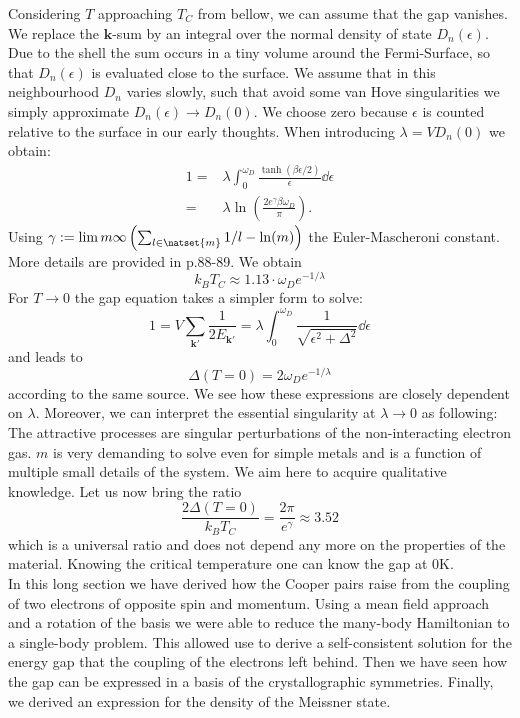 \documentclass[../main.tex]{subfile}
\begin{document}
Considering $T$ approaching $T_C$ from bellow, we can assume that the gap vanishes. We replace the $\bm{k}$-sum by an integral over the normal 
density of state $D_n(\epsilon)$. Due to the shell the sum occurs in a tiny volume around the Fermi-Surface, so that $D_n(\epsilon)$ is 
evaluated close to the surface. We assume that in this neighbourhood $D_n$ varies slowly, such that avoid some van Hove singularities we 
simply approximate $D_n(\epsilon) \rightarrow D_n(0)$. We choose zero because $\epsilon$ is counted relative to the surface in our early thoughts. 
When introducing $\lambda = V D_n(0)$ we obtain:
\begin{equation*}
    \begin{aligned}
        1 =& \lambda \int_0^{\omega_D} \frac{\tanh\left(\beta\epsilon/2\right)}{\epsilon} \dd \epsilon\\
        =& \lambda \ln\left(\frac{2e^{\gamma}\beta \omega_D}{\pi}\right).
    \end{aligned}
\end{equation*}
Using $\gamma := \lim{m}{\infty} \left(\sum_{l\in\natset{m}} 1/l - \ln(m)\right)$ the Euler-Mascheroni constant. More details are provided
in \cite{FossheimSudbo2004} p.88-89. We obtain
\[
    k_B T_C \approx 1.13\cdot  \omega_D e^{-1/\lambda}
\]
For $T\rightarrow 0$ the gap equation takes a simpler form to solve:
\begin{equation*}
        1 = V \sum_{\bm{k}'} \frac{1}{2 E_{\bm{k}'}} = \lambda\int_0^{\omega_D}  \frac{1}{\sqrt{\epsilon^2 + \Delta^2}}\dd \epsilon
\end{equation*}
and leads to 
\[
    \Delta(T=0) = 2 \omega_D e^{-1/\lambda}
\]
according to the same source. We see how these expressions are closely dependent on $\lambda$. Moreover, we can interpret the essential singularity
at $\lambda\rightarrow 0$ as following: The attractive processes are singular perturbations of the non-interacting electron gas.
$m$ is very demanding to solve even for simple metals and is a function of multiple small details of the system. We aim here 
to acquire qualitative knowledge. Let us now bring the ratio
\[
    \frac{2\Delta(T=0)}{k_B T_C} = \frac{2 \pi}{e^{\gamma}} \approx 3.52
\]  
which is a universal ratio and does not depend any more on the properties of the material. Knowing the critical temperature one can know
the gap at $0\si{\kelvin}$.\\

In this long section we have derived how the Cooper pairs raise from the coupling of two electrons of opposite spin and momentum. Using a mean field approach
and a rotation of the basis we were able to reduce the many-body Hamiltonian to a single-body problem. This allowed use to derive a self-consistent solution for 
the energy gap that the coupling of the electrons left behind. Then we have seen how the gap can be expressed in a basis of the crystallographic symmetries.
Finally, we derived an expression for the density of the Meissner state.\\
\end{document}
